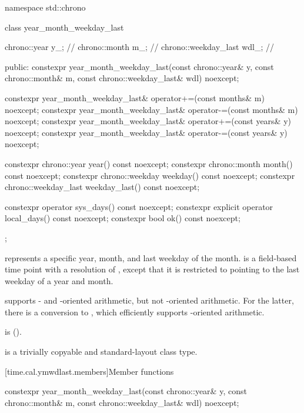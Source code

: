 \begin{codeblock}
namespace std::chrono {
  class year_month_weekday_last {
    chrono::year         y_;    // \expos
    chrono::month        m_;    // \expos
    chrono::weekday_last wdl_;  // \expos

  public:
    constexpr year_month_weekday_last(const chrono::year& y, const chrono::month& m,
                                      const chrono::weekday_last& wdl) noexcept;

    constexpr year_month_weekday_last& operator+=(const months& m) noexcept;
    constexpr year_month_weekday_last& operator-=(const months& m) noexcept;
    constexpr year_month_weekday_last& operator+=(const years& y)  noexcept;
    constexpr year_month_weekday_last& operator-=(const years& y)  noexcept;

    constexpr chrono::year         year()         const noexcept;
    constexpr chrono::month        month()        const noexcept;
    constexpr chrono::weekday      weekday()      const noexcept;
    constexpr chrono::weekday_last weekday_last() const noexcept;

    constexpr          operator sys_days()   const noexcept;
    constexpr explicit operator local_days() const noexcept;
    constexpr bool ok() const noexcept;
  };
}
\end{codeblock}

\pnum
{} represents a specific year, month,
and last weekday of the month.
 is a field-based time point with a resolution of ,
except that it is restricted to pointing to the last weekday of a year and month.
\begin{note}
 supports - and -oriented arithmetic,
but not -oriented arithmetic.
For the latter, there is a conversion to ,
which efficiently supports -oriented arithmetic.
\end{note}
 is  ().

\pnum
{} is a trivially copyable and standard-layout class type.

[time.cal.ymwdlast.members]{Member functions}

%
\begin{itemdecl}
constexpr year_month_weekday_last(const chrono::year& y, const chrono::month& m,
                                  const chrono::weekday_last& wdl) noexcept;
\end{itemdecl}

